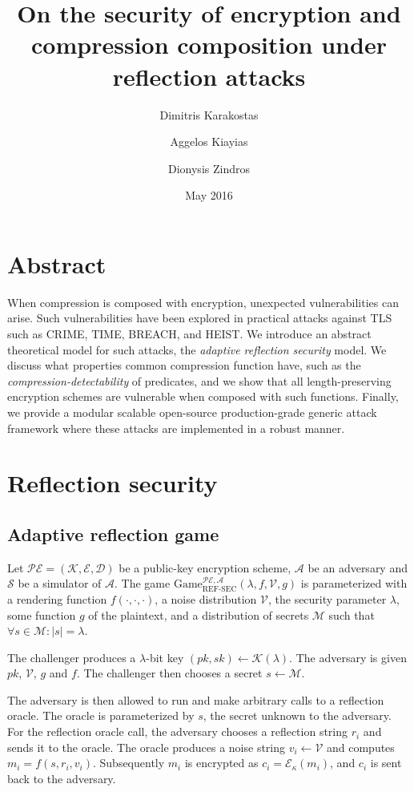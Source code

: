 \documentclass[a4paper, 11 pt, conference]{article}
\title{On the security of encryption and compression composition under reflection attacks}
\author{
Dimitris Karakostas
\and
Aggelos Kiayias
\and
Dionysis Zindros
}
\date{May 2016}
\begin{document}
\maketitle

\section{Abstract}\label{sec:abstract}
When compression is composed with encryption, unexpected vulnerabilities can
arise. Such vulnerabilities have been explored in practical attacks against TLS
such as CRIME, TIME, BREACH, and HEIST. We introduce an abstract theoretical
model for such attacks, the \textit{adaptive reflection security} model. We
discuss what properties common compression function have, such as the
\textit{compression-detectability} of predicates, and we show that all
length-preserving encryption schemes are vulnerable when composed with such
functions. Finally, we provide a modular scalable open-source production-grade
generic attack framework where these attacks are implemented in a robust
manner.

\section{Reflection security}\label{sec:refsec}

\subsection{Adaptive reflection game}\label{subsec:refsecgame}

Let $\mathcal{PE} = (\mathcal{K}, \mathcal{E}, \mathcal{D})$ be a public-key
encryption scheme, $\mathcal{A}$ be an adversary and $\mathcal{S}$ be a
simulator of $\mathcal{A}$.  The game
$\text{Game}_{\text{REF-SEC}}^{\mathcal{PE},\mathcal{A}}(\lambda,  f,
\mathcal{V}, g)$ is parameterized with a rendering function $f(\cdot, \cdot,
\cdot)$, a noise distribution $\mathcal{V}$, the security parameter $\lambda$,
some function $g$ of the plaintext, and a distribution of secrets $\mathcal{M}$
such that $\forall s \in \mathcal{M}: |s| = \lambda$.

The challenger produces a $\lambda$-bit key $(pk, sk) \leftarrow
\mathcal{K}(\lambda)$. The adversary is given $pk$, $\mathcal{V}$, $g$ and $f$.
The challenger then chooses a secret $s \leftarrow \mathcal{M}$.

The adversary is then allowed to run and make arbitrary calls to a reflection
oracle. The oracle is parameterized by $s$, the secret unknown to the
adversary.  For the reflection oracle call, the adversary chooses a reflection
string $r_i$ and sends it to the oracle. The oracle produces a noise string
$v_i \leftarrow \mathcal{V}$ and computes $m_i = f(s, r_i, v_i)$.  Subsequently
$m_i$ is encrypted as $c_i = \mathcal{E}_\kappa(m_i)$, and $c_i$ is sent back
to the adversary.
\end{document}
